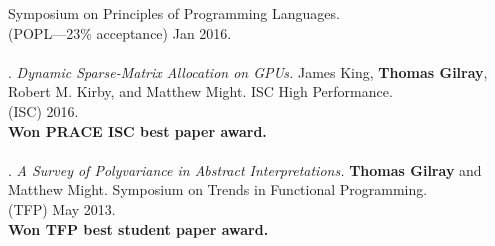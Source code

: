 Symposium on Principles of Programming Languages.
\\(POPL---23\% acceptance) Jan 2016. 
\\ \vspace{-0.1cm}\\
\paper. \textit{Dynamic Sparse-Matrix Allocation on GPUs.}
James King, \textbf{Thomas Gilray}, Robert M. Kirby, and Matthew Might.
ISC High Performance.
\\(ISC) 2016. 
\\\textbf{Won PRACE ISC best paper award.} \\ \vspace{-0.1cm}\\
\paper. \textit{A Survey of Polyvariance in Abstract Interpretations.}
\textbf{Thomas Gilray} and Matthew Might.
Symposium on Trends in Functional Programming.
\\(TFP) May 2013. 
\\\textbf{Won TFP best student paper award.} \\ \vspace{-0.1cm}\\
